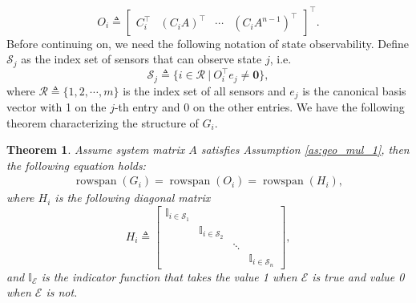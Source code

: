 \documentclass{ieeetrans}   %
\newcommand{\Ib}{{\mathbb{I}}}
\newcommand{\Es}{{\mathscr{E}}}
\newcommand{\Rc}{{\mathcal{R}}}
\newcommand{\Sc}{{\mathcal{S}}}
\DeclareMathOperator{\rs}{{rowspan}}
\newtheorem{theorem}{\textbf{Theorem}}
\begin{document}
\begin{equation}\label{eq:def_O}
	O_{i} \triangleq\left[\begin{array}{c|c|c|c}
		C_{i}^\top &
		\left(C_{i} A\right)^\top &
		\cdots &
		\left(C_{i} A^{n-1}\right)^\top
	\end{array}\right]^\top.
\end{equation}
Before continuing on, we need the following notation of state observability. 
Define $\Sc_j$ as the index set of sensors that can observe state $j$, i.e.
\begin{equation}\label{eq:def_Oc}
	\Sc_j\triangleq \{i\in\Rc\ |\ O_i^\top e_j\neq \mathbf{0} \},
\end{equation}
where $\Rc\triangleq \{1,2,\cdots,m\}$ is the index set of all sensors and $e_j$ is the canonical basis vector with 1 on the $j$-th entry and 0 on the other entries.
We have the following theorem characterizing the structure of $G_i$. 
\begin{theorem}\label{th:span}
	Assume system matrix $A$ satisfies Assumption \ref{as:geo_mul_1}, then the following equation holds:
	\begin{align}
		\rs(G_i)=\rs(O_i)=\rs(H_i) ,
	\end{align}
where $H_i$ is the following diagonal matrix
\begin{equation*}
	H_i\triangleq \begin{bmatrix}
		\Ib_{i\in\Sc_1} & & & \\
		&\Ib_{i\in\Sc_2} & &  \\
		& & \ddots &  \\
		& & & \Ib_{i\in\Sc_n}
	\end{bmatrix} ,
\end{equation*}
and $\mathbb{I}_\Es$ is the indicator function that takes the value 1 when $\Es$ is true and value 0 when $\Es$ is not.
\end{theorem}
\end{document}
